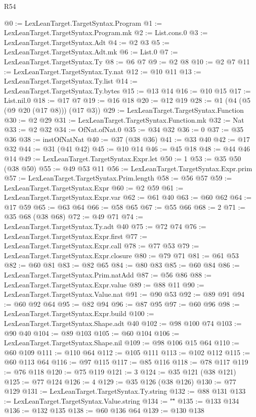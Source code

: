 \begin{lexlean}{R54}
\begin{coremodule}
{{{{{{{{{{{{{{{{{{{{{{{{{{{{{{{{{{{{{{{{{{{{{{{{{{@0 := LexLeanTarget.TargetSyntax.Program
@1 := LexLeanTarget.TargetSyntax.Program.mk
@2 := List.cons.{0}
@3 := LexLeanTarget.TargetSyntax.Adt
@4 := @2 @3
@5 := LexLeanTarget.TargetSyntax.Adt.mk
@6 := List.{0}
@7 := LexLeanTarget.TargetSyntax.Ty
@8 := @6 @7
@9 := @2 @8
@10 := @2 @7
@11 := LexLeanTarget.TargetSyntax.Ty.nat
@12 := @10 @11
@13 := LexLeanTarget.TargetSyntax.Ty.list
@14 := LexLeanTarget.TargetSyntax.Ty.bytes
@15 := @13 @14
@16 := @10 @15
@17 := List.nil.{0}
@18 := @17 @7
@19 := @16 @18
@20 := @12 @19
@28 := @1 (@4 (@5 (@9 @20 (@17 @8))) (@17 @3))
@29 := LexLeanTarget.TargetSyntax.Function
@30 := @2 @29
@31 := LexLeanTarget.TargetSyntax.Function.mk
@32 := Nat
@33 := @2 @32
@34 := OfNat.ofNat.{0}
@35 := @34 @32
@36 := 0
@37 := @35 @36
@38 := instOfNatNat
@40 := @37 (@38 @36)
@41 := @33 @40
@42 := @17 @32
@44 := @31 (@41 @42)
@45 := @10 @14
@46 := @45 @18
@48 := @44 @46 @14
@49 := LexLeanTarget.TargetSyntax.Expr.let
@50 := 1
@53 := @35 @50 (@38 @50)
@55 := @49 @53 @11
@56 := LexLeanTarget.TargetSyntax.Expr.prim
@57 := LexLeanTarget.TargetSyntax.Prim.length
@58 := @56 @57
@59 := LexLeanTarget.TargetSyntax.Expr
@60 := @2 @59
@61 := LexLeanTarget.TargetSyntax.Expr.var
@62 := @61 @40
@63 := @60 @62
@64 := @17 @59
@65 := @63 @64
@66 := @58 @65
@67 := @55 @66
@68 := 2
@71 := @35 @68 (@38 @68)
@72 := @49 @71
@74 := LexLeanTarget.TargetSyntax.Ty.adt @40
@75 := @72 @74
@76 := LexLeanTarget.TargetSyntax.Expr.first
@77 := LexLeanTarget.TargetSyntax.Expr.call
@78 := @77 @53
@79 := LexLeanTarget.TargetSyntax.Expr.closure
@80 := @79 @71
@81 := @61 @53
@82 := @60 @81
@83 := @82 @65
@84 := @80 @83
@85 := @60 @84
@86 := LexLeanTarget.TargetSyntax.Prim.natAdd
@87 := @56 @86
@88 := LexLeanTarget.TargetSyntax.Expr.value
@89 := @88 @11
@90 := LexLeanTarget.TargetSyntax.Value.nat
@91 := @90 @53
@92 := @89 @91
@94 := @60 @92 @64
@95 := @82 @94
@96 := @87 @95
@97 := @60 @96
@98 := LexLeanTarget.TargetSyntax.Expr.build
@100 := LexLeanTarget.TargetSyntax.Shape.adt @40
@102 := @98 @100 @74
@103 := @90 @40
@104 := @89 @103
@105 := @60 @104
@106 := LexLeanTarget.TargetSyntax.Shape.nil
@109 := @98 @106 @15 @64
@110 := @60 @109
@111 := @110 @64
@112 := @105 @111
@113 := @102 @112
@115 := @60 @113 @64
@116 := @97 @115
@117 := @85 @116
@118 := @78 @117
@119 := @76 @118
@120 := @75 @119
@121 := 3
@124 := @35 @121 (@38 @121)
@125 := @77 @124
@126 := 4
@129 := @35 @126 (@38 @126)
@130 := @77 @129
@131 := LexLeanTarget.TargetSyntax.Ty.string
@132 := @88 @131
@133 := LexLeanTarget.TargetSyntax.Value.string
@134 := "\""
@135 := @133 @134
@136 := @132 @135
@138 := @60 @136 @64
@139 := @130 @138
}}}}}}}}}}}}}}}}}}}}}}}}}}}}}}}}}}}}}}}}}}}}}}}}}}
\end{coremodule}
\end{lexlean}
